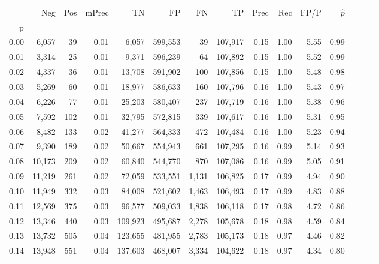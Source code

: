 \begin{tabular}{rrrrrrrrrrrrrrr}
\toprule
{} &     Neg &    Pos & mPrec &       TN &       FP &       FN &       TP &  Prec &   Rec &  FP/P & $\hat{p}$ \\
p    &         &        &       &          &          &          &          &       &       &       &           \\
\midrule
0.00 &   6,057 &     39 &  0.01 &    6,057 &  599,553 &       39 &  107,917 &  0.15 &  1.00 &  5.55 &      0.99 \\
0.01 &   3,314 &     25 &  0.01 &    9,371 &  596,239 &       64 &  107,892 &  0.15 &  1.00 &  5.52 &      0.99 \\
0.02 &   4,337 &     36 &  0.01 &   13,708 &  591,902 &      100 &  107,856 &  0.15 &  1.00 &  5.48 &      0.98 \\
0.03 &   5,269 &     60 &  0.01 &   18,977 &  586,633 &      160 &  107,796 &  0.16 &  1.00 &  5.43 &      0.97 \\
0.04 &   6,226 &     77 &  0.01 &   25,203 &  580,407 &      237 &  107,719 &  0.16 &  1.00 &  5.38 &      0.96 \\
0.05 &   7,592 &    102 &  0.01 &   32,795 &  572,815 &      339 &  107,617 &  0.16 &  1.00 &  5.31 &      0.95 \\
0.06 &   8,482 &    133 &  0.02 &   41,277 &  564,333 &      472 &  107,484 &  0.16 &  1.00 &  5.23 &      0.94 \\
0.07 &   9,390 &    189 &  0.02 &   50,667 &  554,943 &      661 &  107,295 &  0.16 &  0.99 &  5.14 &      0.93 \\
0.08 &  10,173 &    209 &  0.02 &   60,840 &  544,770 &      870 &  107,086 &  0.16 &  0.99 &  5.05 &      0.91 \\
0.09 &  11,219 &    261 &  0.02 &   72,059 &  533,551 &    1,131 &  106,825 &  0.17 &  0.99 &  4.94 &      0.90 \\
0.10 &  11,949 &    332 &  0.03 &   84,008 &  521,602 &    1,463 &  106,493 &  0.17 &  0.99 &  4.83 &      0.88 \\
0.11 &  12,569 &    375 &  0.03 &   96,577 &  509,033 &    1,838 &  106,118 &  0.17 &  0.98 &  4.72 &      0.86 \\
0.12 &  13,346 &    440 &  0.03 &  109,923 &  495,687 &    2,278 &  105,678 &  0.18 &  0.98 &  4.59 &      0.84 \\
0.13 &  13,732 &    505 &  0.04 &  123,655 &  481,955 &    2,783 &  105,173 &  0.18 &  0.97 &  4.46 &      0.82 \\
0.14 &  13,948 &    551 &  0.04 &  137,603 &  468,007 &    3,334 &  104,622 &  0.18 &  0.97 &  4.34 &      0.80 \\

\end{tabular}
